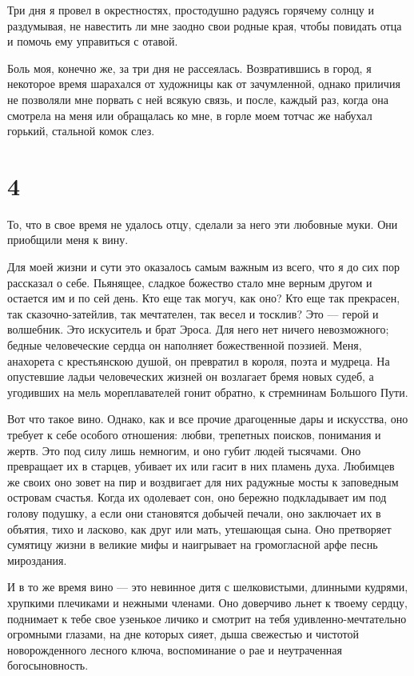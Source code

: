 Три дня я провел в окрестностях, простодушно радуясь горячему солнцу и
раздумывая,  не  навестить  ли  мне заодно  свои  родные  края,  чтобы
повидать отца и помочь ему управиться с отавой.

Боль моя, конечно же, за три дня не рассеялась. Возвратившись в город,
я некоторое  время шарахался от  художницы как от  зачумленной, однако
приличия не позволяли мне порвать с  ней всякую связь, и после, каждый
раз, когда  она смотрела на меня  или обращалась ко мне,  в горле моем
тотчас же набухал горький, стальной комок слез.


\section*{4}


То, что  в свое время  не удалось отцу,  сделали за него  эти любовные
муки. Они приобщили меня к вину.

Для моей жизни  и сути это оказалось  самым важным из всего,  что я до
сих пор рассказал о себе.  Пьянящее, сладкое божество стало мне верным
другом  и остается  им и  по сей  день. Кто  еще так  могуч, как  оно?
Кто  еще так  прекрасен,  так сказочно-затейлив,  так мечтателен,  так
весел и  тосклив? Это  --- герой  и волшебник.  Это искуситель  и брат
Эроса. Для  него нет  ничего невозможного; бедные  человеческие сердца
он  наполняет божественной  поэзией.  Меня,  анахорета с  крестьянскою
душой, он  превратил в  короля, поэта и  мудреца. На  опустевшие ладьи
человеческих жизней  он возлагает  бремя новых  судеб, а  угодивших на
мель мореплавателей гонит обратно, к стремнинам Большого Пути.

Вот  что такое  вино.  Однако, как  и все  прочие  драгоценные дары  и
искусства,  оно требует  к  себе особого  отношения: любви,  трепетных
поисков, понимания  и жертв. Это под  силу лишь немногим, и  оно губит
людей тысячами.  Оно превращает их в  старцев, убивает их или  гасит в
них пламень духа. Любимцев же своих  оно зовет на пир и воздвигает для
них радужные мосты  к заповедным островам счастья.  Когда их одолевает
сон,  оно бережно  подкладывает  им  под голову  подушку,  а если  они
становятся добычей печали, оно заключает их в объятия, тихо и ласково,
как друг  или мать,  утешающая сына. Оно  претворяет сумятицу  жизни в
великие мифы и наигрывает на громогласной арфе песнь мироздания.

И в  то же время вино  --- это невинное дитя  с шелковистыми, длинными
кудрями, хрупкими плечиками  и нежными членами. Оно  доверчиво льнет к
твоему сердцу, поднимает к тебе свое узенькое личико и смотрит на тебя
удивленно-мечтательно огромными  глазами, на  дне которых  сияет, дыша
свежестью и чистотой новорожденного  лесного ключа, воспоминание о рае
и неутраченная богосыновность.

